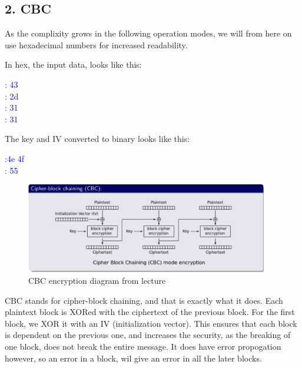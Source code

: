 \documentclass{article}
\begin{document}
\newpage
\subsection{2. CBC}

As the complixity grows in the following operation modes, we will from here on use hexadecimal numbers for increased readability.

In hex, the  input data, looks like this:
\begin{tcolorbox}
\begin{center}
\textcolor{blue}{
: 43\\
: 2d\\
: 31\\
: 31}
\end{center}
\end{tcolorbox}

The key and IV converted to binary looks like this: 
\begin{tcolorbox}
\begin{center}
\textcolor{blue}{
:\qquad4e 4f\\
: 55}
\end{center}
\end{tcolorbox}


\begin{figure}[H]
 \centering
  \includegraphics[width=300pt]{img/cbcLecture.png}
 \caption{CBC encryption diagram from lecture}
 \end{figure}

CBC stands for cipher-block chaining, and that is exactly what it does. Each plaintext block is XORed with the ciphertext of the previous block. For the first block, we XOR it with an IV (initialization vector). This ensures that each block is dependent on the previous one, and increases the security, as the breaking of one block, does not break the entire message. It does have error propogation however, so an error in a block, wil give an error in all the later blocks. 
\end{document}
